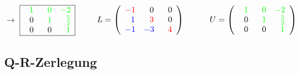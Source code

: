 	$\rightarrow$
	$\begin{array}{|ccc|}
			\hline 
			\color{green}\ \ 1 & \color{green}\ \ 0 & \color{green}-2\\
			\ \ 0 & \color{green}\ \ 1 & \color{green}\ \ \frac 5 3\\
			\ \ 0 & \ \ 0 & \color{green}\ \ 1\\
			\hline
	\end{array}$\ \ \ \ \	
	$L=	\left(\begin{array}{ccc}
			\color{red}-1 &\ \ 0 &\ \ 0\\
		 	\color{blue}\ \ 1 &\color{red}\ \ 3 &\ \ 0\\
			\color{blue}-1 &\color{blue} -3 &\color{red}\ \ 4\\
	\end{array}\right)$\ \ \ \ \ \ 
	$U=	\left(\begin{array}{ccc}
			\color{green}\ \ 1 &\color{green}\ \ 0 &\color{green}-2\\
		 	\ \ 0 &\color{green}\ \ 1 &\color{green}\ \ \frac 5 3\\
			\ \ 0 &\ \ 0 &\color{green}\ \ 1\\
	\end{array}\right)$\\	
\subsection{Q-R-Zerlegung}
















